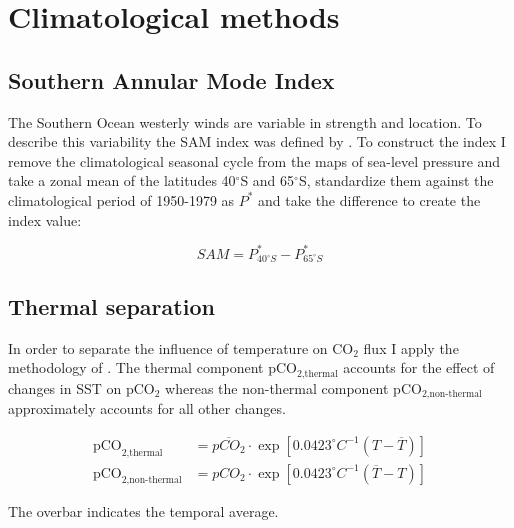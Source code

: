 \section{Climatological methods}

\subsection{Southern Annular Mode Index}
\label{sec:sam}
The Southern Ocean westerly winds are variable in strength and location. To describe this variability the \ac{SAM} index was defined by \cite{Gong1999}. To construct the index I remove the climatological seasonal cycle from the maps of sea-level pressure and take a zonal mean of the latitudes 40$^\circ$S and 65$^\circ$S, standardize them against the climatological period of 1950-1979 as $P^*$ and take the difference to create the index value:

\[ SAM={P}^*_{40^{\circ}S} - {P}^*_{65^{\circ}S}\] 

\subsection{Thermal separation}
\label{sec:takahashi}
In order to separate the influence of temperature on CO$_2$ flux I apply the methodology of \cite{Takahashi1993,Takahashi2002}. The thermal component pCO$_{\text{2,thermal}}$ accounts for the effect of changes in \acf{SST} on pCO$_2$ whereas the non-thermal component pCO$_{\text{2,non-thermal}}$ approximately accounts for all other changes.%

\begin{align}
\text{pCO}_{\text{2,thermal}}&=\overline{pCO_2} \cdot \exp \left[ 0.0423 ^{\circ}C^{-1}\left( T - \overline{T} \right) \right] \\
\text{pCO}_{\text{2,non-thermal}}&=pCO_2 \cdot \exp \left[ 0.0423 ^{\circ}C^{-1}\left( \overline{T} - T \right) \right]
\end{align}

\noindent The overbar indicates the temporal average.